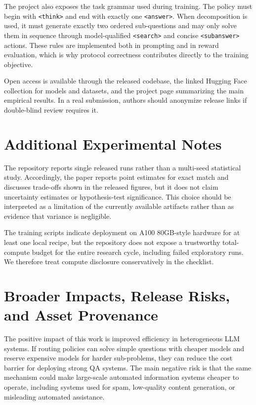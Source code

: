 \documentclass{article}
\begin{document}
The project also exposes the task grammar used during training. The policy must begin with \texttt{<think>} and end with exactly one \texttt{<answer>}. When decomposition is used, it must generate exactly two ordered sub-questions and may only solve them in sequence through model-qualified \texttt{<search>} and concise \texttt{<subanswer>} actions. These rules are implemented both in prompting and in reward evaluation, which is why protocol correctness contributes directly to the training objective.

Open access is available through the released codebase, the linked Hugging Face collection for models and datasets, and the project page summarizing the main empirical results. In a real submission, authors should anonymize release links if double-blind review requires it.

\section{Additional Experimental Notes}
\label{app:expdetails}

The repository reports single released runs rather than a multi-seed statistical study. Accordingly, the paper reports point estimates for exact match and discusses trade-offs shown in the released figures, but it does not claim uncertainty estimates or hypothesis-test significance. This choice should be interpreted as a limitation of the currently available artifacts rather than as evidence that variance is negligible.

The training scripts indicate deployment on A100 80GB-style hardware for at least one local recipe, but the repository does not expose a trustworthy total-compute budget for the entire research cycle, including failed exploratory runs. We therefore treat compute disclosure conservatively in the checklist.

\section{Broader Impacts, Release Risks, and Asset Provenance}
\label{app:ethics}

The positive impact of this work is improved efficiency in heterogeneous LLM systems. If routing policies can solve simple questions with cheaper models and reserve expensive models for harder sub-problems, they can reduce the cost barrier for deploying strong QA systems. The main negative risk is that the same mechanism could make large-scale automated information systems cheaper to operate, including systems used for spam, low-quality content generation, or misleading automated assistance.
\end{document}
